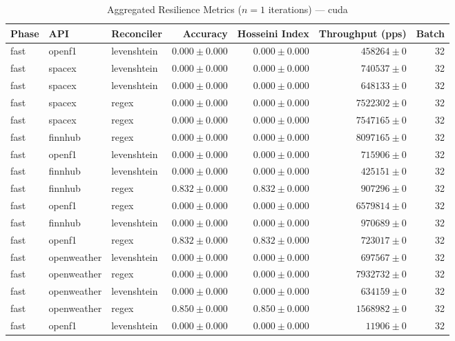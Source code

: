 
\begin{table}[htbp]
\caption{Aggregated Resilience Metrics ($n=1$ iterations) --- cuda}
\begin{tabular}{l l l r r r r}
\hline
Phase & API & Reconciler & Accuracy & Hosseini Index & Throughput (pps) & Batch \\
\hline
fast & openf1 & levenshtein & $0.000\pm0.000$ & $0.000\pm0.000$ & $458264\pm0$ & 32 \\
fast & spacex & levenshtein & $0.000\pm0.000$ & $0.000\pm0.000$ & $740537\pm0$ & 32 \\
fast & spacex & levenshtein & $0.000\pm0.000$ & $0.000\pm0.000$ & $648133\pm0$ & 32 \\
fast & spacex & regex & $0.000\pm0.000$ & $0.000\pm0.000$ & $7522302\pm0$ & 32 \\
fast & spacex & regex & $0.000\pm0.000$ & $0.000\pm0.000$ & $7547165\pm0$ & 32 \\
fast & finnhub & regex & $0.000\pm0.000$ & $0.000\pm0.000$ & $8097165\pm0$ & 32 \\
fast & openf1 & levenshtein & $0.000\pm0.000$ & $0.000\pm0.000$ & $715906\pm0$ & 32 \\
fast & finnhub & levenshtein & $0.000\pm0.000$ & $0.000\pm0.000$ & $425151\pm0$ & 32 \\
fast & finnhub & regex & $0.832\pm0.000$ & $0.832\pm0.000$ & $907296\pm0$ & 32 \\
fast & openf1 & regex & $0.000\pm0.000$ & $0.000\pm0.000$ & $6579814\pm0$ & 32 \\
fast & finnhub & levenshtein & $0.000\pm0.000$ & $0.000\pm0.000$ & $970689\pm0$ & 32 \\
fast & openf1 & regex & $0.832\pm0.000$ & $0.832\pm0.000$ & $723017\pm0$ & 32 \\
fast & openweather & levenshtein & $0.000\pm0.000$ & $0.000\pm0.000$ & $697567\pm0$ & 32 \\
fast & openweather & regex & $0.000\pm0.000$ & $0.000\pm0.000$ & $7932732\pm0$ & 32 \\
fast & openweather & levenshtein & $0.000\pm0.000$ & $0.000\pm0.000$ & $634159\pm0$ & 32 \\
fast & openweather & regex & $0.850\pm0.000$ & $0.850\pm0.000$ & $1568982\pm0$ & 32 \\
fast & openf1 & levenshtein & $0.000\pm0.000$ & $0.000\pm0.000$ & $11906\pm0$ & 32 \\

\end{tabular}
\end{table}
